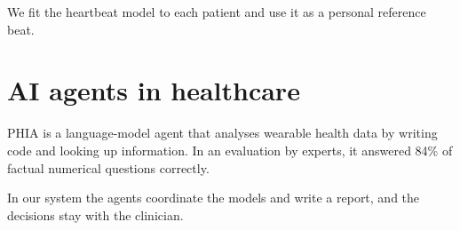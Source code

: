 We fit the heartbeat model to each patient and use it as a personal reference beat.

\section{AI agents in healthcare}
\label{sec:rw-agents}

PHIA \cite{merrill2026transforming} is a language-model agent that analyses wearable health data by writing code and looking up information. In an evaluation by experts, it answered 84\% of factual numerical questions correctly.

In our system the agents coordinate the models and write a report, and the decisions stay with the clinician.
